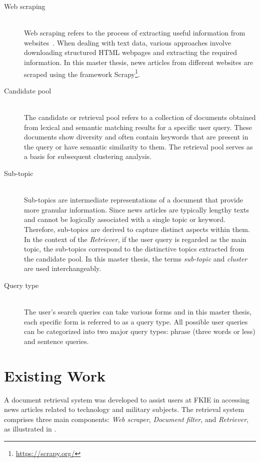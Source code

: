 \begin{description}
	\item[Web scraping] \hfill \\ Web scraping refers to the process of extracting useful information from websites~\cite{khder2021web}. When dealing with text data, various approaches involve downloading structured \ac{HTML} webpages and extracting the required information. In this master thesis, news articles from different websites are scraped using the framework Scrapy\footnote{\url{https://scrapy.org/}}.  
	
	\item[Candidate pool] \hfill \\ The candidate or retrieval pool refers to a collection of documents obtained from lexical and semantic matching results for a specific user query. These documents show diversity and often contain keywords that are present in the query or have semantic similarity to them. The retrieval pool serves as a basis for subsequent clustering analysis.
	
	\item[Sub-topic] \hfill \\ Sub-topics are intermediate representations of a document that provide more granular information. Since news articles are typically lengthy texts and cannot be logically associated with a single topic or keyword. Therefore, sub-topics are derived to capture distinct aspects within them. In the context of the \emph{Retriever}, if the user query is regarded as the main topic, the sub-topics correspond to the distinctive topics extracted from the candidate pool. In this master thesis, the terms \emph{sub-topic} and \emph{cluster} are used interchangeably. 
	
	\item[Query type] \hfill \\ The user's search queries can take various forms and in this master thesis, each specific form is referred to as a query type. All possible user queries can be categorized into two major query types: phrase (three words or less) and sentence queries.
	
\end{description}

\section{Existing Work}

A document retrieval system was developed to assist users at \ac{FKIE} in accessing news articles related to technology and military subjects. The retrieval system comprises three main components: \emph{Web scraper}, \emph{Document filter}, and \emph{Retriever}, as illustrated in .

